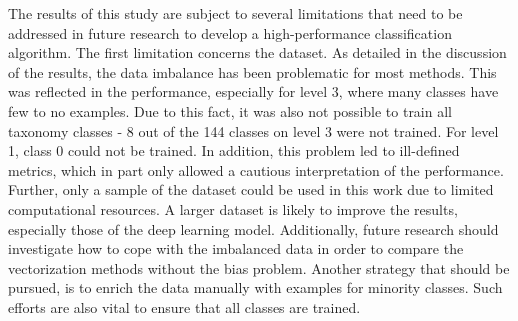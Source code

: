 \documentclass[12pt, a4paper, titlepage]{article}
\begin{document}
The results of this study are subject to several limitations that need to be addressed in future research to develop a high-performance classification algorithm. The first limitation concerns the dataset. As detailed in the discussion of the results, the data imbalance has been problematic for most methods. This was reflected in the performance, especially for level 3, where many classes have few to no examples. Due to this fact, it was also not possible to train all taxonomy classes - 8 out of the 144 classes on level 3 were not trained. For level 1, class 0 could not be trained. In addition, this problem led to ill-defined metrics, which in part only allowed a cautious interpretation of the performance. Further, only a sample of the dataset could be used in this work due to limited computational resources. A larger dataset is likely to improve the results, especially those of the deep learning model. Additionally, future research should investigate how to cope with the imbalanced data in order to compare the vectorization methods without the bias problem. Another strategy that should be pursued, is to enrich the data manually with examples for minority classes. Such efforts are also vital to ensure that all classes are trained.
\end{document}
